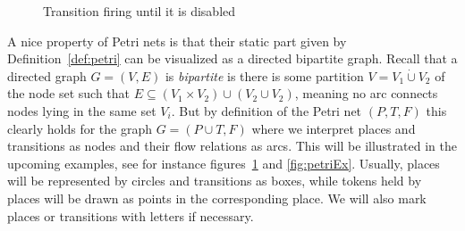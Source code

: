 \documentclass[
  paper=a4,
  titlepage,
  bibliography=totoc,
  listof=totoc,
  pagesize=pdftex
]{scrartcl}
\numberwithin{figure}{section}
\numberwithin{equation}{section}
\numberwithin{table}{section}
\newcommand*\dotcup{\mathbin{\dot{\cup}}}
\theoremstyle{definition}
\numberwithin{definition}{section}
\begin{document}
\begin{figure}[htbp]
  \centering
  \caption{Transition firing until it is disabled}
  \label{fig:firing}
\end{figure}

A nice property of Petri nets is that their static part given by
Definition~\ref{def:petri} can be visualized as a directed bipartite graph. Recall that a
directed graph $G = (V,E)$ is \emph{bipartite} is there is some partition $V = V_1 \dotcup
V_2$ of the node set such that $E \subseteq (V_1 \times V_2) \cup (V_2 \cup V_2)$, meaning
no arc connects nodes lying in the same set $V_i$. But by definition of the Petri net
$(P,T,F)$ this clearly holds for the graph $G = (P \cup T, F)$ where we interpret places
and transitions as nodes and their flow relations as arcs. This will be illustrated in the
upcoming examples, see for instance figures~\ref{fig:firing} and \ref{fig:petriEx}.
Usually, places will be represented by circles and transitions as boxes, while tokens held
by places will be drawn as points in the corresponding place. We will also mark places or
transitions with letters if necessary.
\end{document}
